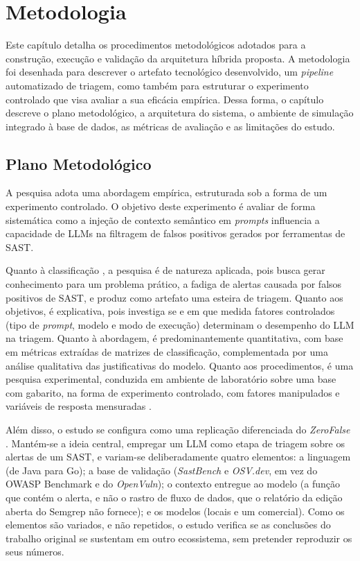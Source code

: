 \chapter{Metodologia}
\label{cap:metodologia}

Este capítulo detalha os procedimentos metodológicos adotados para a construção, execução e validação da arquitetura híbrida proposta. A metodologia foi desenhada para descrever o artefato tecnológico desenvolvido, um \textit{pipeline} automatizado de triagem, como também para estruturar o experimento controlado que visa avaliar a sua eficácia empírica. Dessa forma, o capítulo descreve o plano metodológico, a arquitetura do sistema, o ambiente de simulação integrado à base de dados, as métricas de avaliação e as limitações do estudo.

\section{Plano Metodológico}
\label{sec:plano}

A pesquisa adota uma abordagem empírica, estruturada sob a forma de um experimento controlado. O objetivo deste experimento é avaliar de forma sistemática como a injeção de contexto semântico em \textit{prompts} influencia a capacidade de LLMs na filtragem de falsos positivos gerados por ferramentas de SAST.

Quanto à classificação \cite{prodanov2013}, a pesquisa é de natureza aplicada, pois busca gerar conhecimento para um problema prático, a fadiga de alertas causada por falsos positivos de SAST, e produz como artefato uma esteira de triagem. Quanto aos objetivos, é explicativa, pois investiga se e em que medida fatores controlados (tipo de \textit{prompt}, modelo e modo de execução) determinam o desempenho do LLM na triagem. Quanto à abordagem, é predominantemente quantitativa, com base em métricas extraídas de matrizes de classificação, complementada por uma análise qualitativa das justificativas do modelo. Quanto aos procedimentos, é uma pesquisa experimental, conduzida em ambiente de laboratório sobre uma base com gabarito, na forma de experimento controlado, com fatores manipulados e variáveis de resposta mensuradas \cite{wohlin2012}.

Além disso, o estudo se configura como uma replicação diferenciada do \textit{ZeroFalse} \cite{iranmanesh2025zerofalseimprovingprecisionstatic}. Mantém-se a ideia central, empregar um LLM como etapa de triagem sobre os alertas de um SAST, e variam-se deliberadamente quatro elementos: a linguagem (de Java para Go); a base de validação (\textit{SastBench} e \textit{OSV.dev}, em vez do OWASP Benchmark e do \textit{OpenVuln}); o contexto entregue ao modelo (a função que contém o alerta, e não o rastro de fluxo de dados, que o relatório da edição aberta do Semgrep não fornece); e os modelos (locais e um comercial). Como os elementos são variados, e não repetidos, o estudo verifica se as conclusões do trabalho original se sustentam em outro ecossistema, sem pretender reproduzir os seus números.

